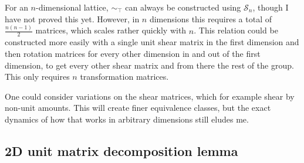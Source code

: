 \documentclass{article}
\def\S{\mathcal{S}}
\begin{document}
For an $n$-dimensional lattice, $\sim_\top$ can always be constructed using $\S_n$, though I have not proved this yet. However, in $n$ dimensions this requires a total of $\frac{n(n-1)}{2}$ matrices, which scales rather quickly with $n$. This relation could be constructed more easily with a single unit shear matrix in the first dimension and then rotation matrices for every other dimension in and out of the first dimension, to get every other shear matrix and from there the rest of the group. This only requires $n$ transformation matrices.

One could consider variations on the shear matrices, which for example shear by non-unit amounts. This will create finer equivalence classes, but the exact dynamics of how that works in arbitrary dimensions still eludes me.

\subsection{2D unit matrix decomposition lemma}
\end{document}
